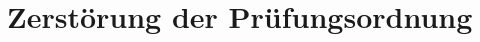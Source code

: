 \newpage
\section{Zerstörung der Prüfungsordnung}
\label{sec:zerstoerung}
\charaktere{-}
\setting{-}
\hauptbeamer{-}
\sound{-}
\licht{-}
\requisiten{-}
    
